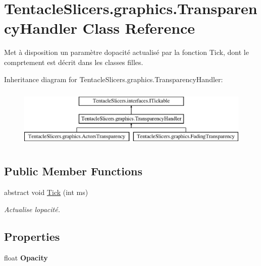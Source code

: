 \hypertarget{class_tentacle_slicers_1_1graphics_1_1_transparency_handler}{}\section{Tentacle\+Slicers.\+graphics.\+Transparency\+Handler Class Reference}
\label{class_tentacle_slicers_1_1graphics_1_1_transparency_handler}


Met à disposition un paramètre d\textquotesingle{}opacité actualisé par la fonction Tick, dont le comprtement est décrit dans les classes filles.  


Inheritance diagram for Tentacle\+Slicers.\+graphics.\+Transparency\+Handler\+:\begin{figure}[H]
\begin{center}
\leavevmode
\includegraphics[height=2.916667cm]{class_tentacle_slicers_1_1graphics_1_1_transparency_handler}
\end{center}
\end{figure}
\subsection*{Public Member Functions}
\begin{DoxyCompactItemize}
\item 
abstract void \hyperlink{class_tentacle_slicers_1_1graphics_1_1_transparency_handler_ab0f18e90768c180b0f804e1531a7c210}{Tick} (int ms)
\begin{DoxyCompactList}\small\item\em Actualise l\textquotesingle{}opacité. \end{DoxyCompactList}\end{DoxyCompactItemize}
\subsection*{Properties}
\begin{DoxyCompactItemize}
\item 
\mbox{\label{class_tentacle_slicers_1_1graphics_1_1_transparency_handler_a4b70c4b30841b20cc8affa0babbad511}} 
float {\bfseries Opacity}
\end{DoxyCompactItemize}


